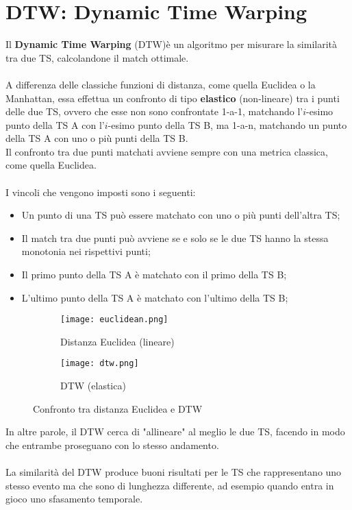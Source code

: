 \section{DTW: Dynamic Time Warping}
Il \textbf{Dynamic Time Warping} (DTW)\cite{dtw}è un algoritmo per misurare la similarità tra due TS, calcolandone il match ottimale.\\
\\
A differenza delle classiche funzioni di distanza, come quella Euclidea o la Manhattan, essa effettua un confronto di tipo \textbf{elastico} (non-lineare) tra i punti delle due TS, ovvero che esse non sono confrontate 1-a-1, matchando l'$i$-esimo punto della TS A con l'$i$-esimo punto della TS B, ma 1-a-n, matchando un punto della TS A con uno o più punti della TS B.\\
Il confronto tra due punti matchati avviene sempre con una metrica classica, come quella Euclidea.\\
\\
I vincoli che vengono imposti sono i seguenti:
\begin{itemize}
	\item Un punto di una TS può essere matchato con uno o più punti dell'altra TS;
	\item Il match tra due punti può avviene se e solo se le due TS hanno la stessa monotonia nei rispettivi punti;
	\item Il primo punto della TS A è matchato con il primo della TS B;
	\item L'ultimo punto della TS A è matchato con l'ultimo della TS B; 
\end{itemize}
\begin{figure}[H]
	\centering
	\begin{subfigure}{.5\textwidth}
		\centering
		\texttt{[image: euclidean.png]}
		\caption{Distanza Euclidea (lineare)}
		\label{fig:distance_euclidean}
	\end{subfigure}%
	\begin{subfigure}{.5\textwidth}
		\centering
		\texttt{[image: dtw.png]}
		\caption{DTW (elastica)}
		\label{fig:distance_dtw}
	\end{subfigure}
	\caption{Confronto tra distanza Euclidea e DTW}
	\label{fig:distance}
\end{figure}
In altre parole, il DTW cerca di "allineare" al meglio le due TS, facendo in modo che entrambe proseguano con lo stesso andamento.\\
\\
La similarità del DTW produce buoni risultati per le TS che rappresentano uno stesso evento ma che sono di lunghezza differente, ad esempio quando entra in gioco uno sfasamento temporale.\\
